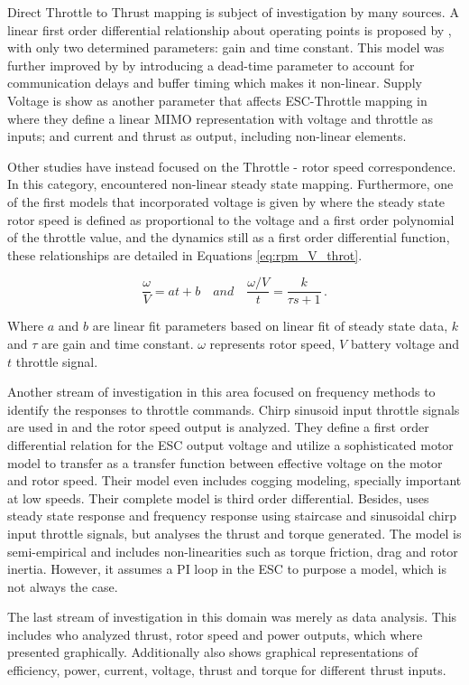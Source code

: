 Direct Throttle to Thrust mapping is subject of investigation by many sources. A linear first order differential relationship about operating points is proposed by \cite{Yoon2015}, with only two determined parameters: gain and time constant. This model was further improved by \cite{Torres2020} by introducing a dead-time parameter to account for communication delays and buffer timing which makes it non-linear.
Supply Voltage is show as another parameter that affects ESC-Throttle mapping in \cite{Szafranski2014} where they define a linear MIMO representation with voltage and throttle as inputs; and current and thrust as output, including non-linear elements.
\newline

Other studies have instead focused on the Throttle - rotor speed correspondence. In this category, \cite{Prakosa2019} encountered non-linear steady state mapping. Furthermore, one of the first models that incorporated voltage is given by \cite{Moutinho2015} where the steady state rotor speed is defined as proportional to the voltage and a first order polynomial of the throttle value, and the dynamics still as a first order differential function, these relationships are detailed in Equations \ref{eq:rpm_V_throt}.

\begin{equation}
 \frac{\omega}{V}= at +b  \quad and \quad \frac{\omega /V}{t}=\frac{k}{\tau s+1}\, .
 \label{eq:rpm_V_throt}   
\end{equation}

Where $a$ and $b$ are linear fit parameters based on linear fit of steady state data, $k$ and $\tau$ are gain and time constant. $\omega$ represents rotor speed, $V$ battery voltage and $t$ throttle signal.
\newline

Another stream of investigation in this area focused on frequency methods to identify the responses to throttle commands. Chirp sinusoid input throttle signals are used in \cite{Xiang2015} and the rotor speed output is analyzed. They define a first order differential relation for the ESC output voltage and utilize a sophisticated motor model to transfer as a transfer function between effective voltage on the motor and rotor speed. Their model even includes cogging modeling, specially important at low speeds. Their complete model is third order differential.
Besides, \cite{Wu2018} uses steady state response and frequency response using staircase and sinusoidal chirp input throttle signals, but analyses the thrust and torque generated. The model is semi-empirical and includes non-linearities such as torque friction, drag and rotor inertia. However, it assumes a PI loop in the ESC to purpose a model, which is not always the case.

The last stream of investigation in this domain was merely as data analysis. This includes \cite{Kotarski2017} who analyzed thrust, rotor speed and power outputs, which where presented graphically. Additionally \cite{Sulewski2018} also shows graphical representations of efficiency, power, current, voltage, thrust and torque for different thrust inputs.